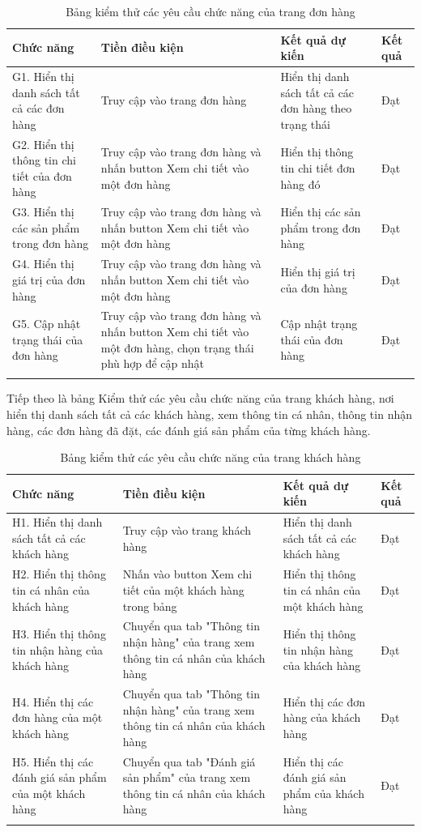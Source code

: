 \begin{longtable}{|p{4cm}|p{4cm}|p{4cm}|p{2cm}|}
    \hline
    Chức năng & Tiền điều kiện & Kết quả dự kiến & Kết quả \\
    \hline
    G1. Hiển thị danh sách tất cả các đơn hàng & Truy cập vào trang đơn hàng & Hiển thị danh sách tất cả các đơn hàng theo trạng thái & Đạt\\
    \hline
     G2. Hiển thị thông tin chi tiết của đơn hàng & Truy cập vào trang đơn hàng và nhấn button Xem chi tiết vào một đơn hàng & Hiển thị thông tin chi tiết đơn hàng đó & Đạt\\
    \hline
     G3. Hiển thị các sản phẩm trong đơn hàng & Truy cập vào trang đơn hàng và nhấn button Xem chi tiết vào một đơn hàng  & Hiển thị các sản phẩm trong đơn hàng & Đạt\\
     \hline
     G4. Hiển thị giá trị của đơn hàng & Truy cập vào trang đơn hàng và nhấn button Xem chi tiết vào một đơn hàng  & Hiển thị giá trị của đơn hàng & Đạt\\
      \hline
     G5. Cập nhật trạng thái của đơn hàng & Truy cập vào trang đơn hàng và nhấn button Xem chi tiết vào một đơn hàng, chọn trạng thái phù hợp để cập nhật  & Cập nhật trạng thái của đơn hàng & Đạt\\
    \hline
    \caption{Bảng kiểm thử các yêu cầu chức năng của trang đơn hàng}
\end{longtable}
Tiếp theo là bảng Kiểm thử các yêu cầu chức năng của trang khách hàng, nơi hiển thị danh sách tất cả các khách hàng, xem thông tin cá nhân, thông tin nhận hàng, các đơn hàng đã đặt, các đánh giá sản phẩm của từng khách hàng.
\begin{longtable}{|p{4cm}|p{4cm}|p{4cm}|p{2cm}|}
    \hline
    Chức năng & Tiền điều kiện & Kết quả dự kiến & Kết quả \\
    \hline
    H1. Hiển thị danh sách tất cả các khách hàng & Truy cập vào trang khách hàng & Hiển thị danh sách tất cả các khách hàng & Đạt\\
    \hline
     H2. Hiển thị thông tin cá nhân của khách hàng & Nhấn vào button Xem chi tiết của một khách hàng trong bảng & Hiển thị thông tin cá nhân của một khách hàng & Đạt\\
    \hline
     H3. Hiển thị thông tin nhận hàng của khách hàng & Chuyển qua tab "Thông tin nhận hàng" của trang xem thông tin cá nhân của khách hàng & Hiển thị thông tin nhận hàng của khách hàng & Đạt\\
     \hline
     H4. Hiển thị các đơn hàng của một khách hàng & Chuyển qua tab "Thông tin nhận hàng" của trang xem thông tin cá nhân của khách hàng & Hiển thị các đơn hàng của khách hàng & Đạt\\
     \hline
      H5. Hiển thị các đánh giá sản phẩm của một khách hàng & Chuyển qua tab "Đánh giá sản phẩm" của trang xem thông tin cá nhân của khách hàng & Hiển thị các đánh giá sản phẩm của khách hàng & Đạt\\
    \hline
    \caption{Bảng kiểm thử các yêu cầu chức năng của trang khách hàng}
\end{longtable}
